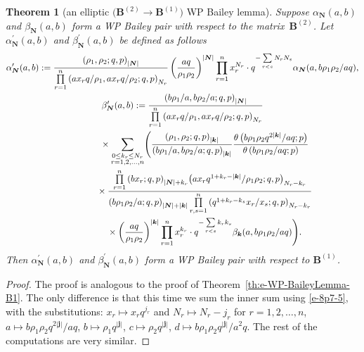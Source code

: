 \documentclass[pdftex]{sigma}
\numberwithin{equation}{section}
\newtheorem{Theorem}{Theorem}[section]
\newcommand{\sumN}{{\left| \boldsymbol{N} \right|}}
\newcommand\sumj{{\left| \boldsymbol {j} \right|}}
\newcommand\sumk{{\left| \boldsymbol{k} \right|}}
\newcommand{\B}{{ \mathbf B}}
\newcommand{\N}{{ \boldsymbol N}}
\renewcommand{\k}{{ \boldsymbol{k}}}
\newcommand{\multsum}[3]{{\sum\limits_{\substack{{0\le #1_#3 \le #2_#3} \\
{#3 =1,2,\dots, n}}}}}
\newcommand{\sqprod}[1]{\prod\limits_{r, s =1}^{#1}} %
\newcommand{\smallprod}[1]{\prod\limits_{r =1}^{#1}} %
\newcommand{\xover}[1]{#1_{r}/#1_{s}}
\newcommand{\ellipticqrfac}[2]{{\left({#1}; q, p\right)_{#2}}} %
\newcommand{\elliptictheta}[1]{\theta \left({#1} ; p\right) }
\begin{document}
\begin{Theorem}[an elliptic $\big(\B^{(2)} \to\B^{(1)}\big)$ WP Bailey lemma] \label{th:e-WP-BaileyLemma-B2-B1}
Suppose $\alpha_\N(a,b)$ and $\beta_\N(a,b)$ form a WP Bailey pair with respect to the matrix~$\B^{(2)}$. Let ${\alpha}^{\prime}_\N(a,b)$ and ${\beta}^{\prime}_\N(a,b)$ be defined as follows
\begin{gather*}
{\alpha}^{\prime}_\N(a,b) := \frac{\ellipticqrfac{\rho_1, \rho_2}{\sumN}}
 {\smallprod n \ellipticqrfac{ax_rq/\rho_1, ax_rq/\rho_2}{N_r}}
 \left(\frac{aq}{\rho_1\rho_2}\right)^{\sumN} %
 \smallprod n x_r^{N_r}\cdot
q^{-\sum\limits_{r<s} N_r N_s} \alpha_\N(a, b\rho_1\rho_2/aq),\\
{\beta}^{\prime}_\N (a,b) := \frac{\ellipticqrfac{b\rho_1/a, b\rho_2/a }{\sumN}}
{\smallprod n \ellipticqrfac{ax_rq/\rho_1, ax_rq/\rho_2}{N_r}}\\
\hphantom{{\beta}^{\prime}_\N (a,b) :=}{}
 \times \multsum{k}{N}{r} \Bigg( \frac{ \ellipticqrfac{\rho_1, \rho_2}{\sumk}}
{\ellipticqrfac{b\rho_1/a, b\rho_2/a}{\sumk}}
 \frac{\elliptictheta{ b\rho_1\rho_2q^{2\sumk}/{aq}}}{\elliptictheta{ b\rho_1\rho_2/{aq}}}\\
\hphantom{{\beta}^{\prime}_\N (a,b) :=}{}\times
\frac{\smallprod n \ellipticqrfac{bx_r}{\sumN+k_r}
 \ellipticqrfac{ax_rq^{1+k_r-\sumk}/\rho_1\rho_2 }{N_r-k_r}}{
\ellipticqrfac{b\rho_1\rho_2/a}{\sumN+\sumk}
\sqprod n \ellipticqrfac{q^{1+k_r-k_s}\xover x }{N_r-k_r}} \notag\\
\hphantom{{\beta}^{\prime}_\N (a,b) :=}{} \times
\left(\frac{aq}{\rho_1\rho_2}\right)^{\sumk} \smallprod n x_r^{k_r}\cdot q^{-\sum\limits_{r<s} k_rk_s} \beta_\k(a,b\rho_1\rho_2/aq) \Bigg).
\end{gather*}
Then ${\alpha}^{\prime}_\N(a,b)$ and ${\beta}^{\prime}_\N(a,b)$ form a WP Bailey pair with respect to $\B^{(1)}$.
\end{Theorem}

\begin{proof} The proof is analogous to the proof of Theorem~\ref{th:e-WP-BaileyLemma-B1}. The only difference is that this time we sum
the inner sum using \eqref{e-8p7-5}, with the substitutions: $x_r\mapsto x_rq^{j_r}$ and $N_r\mapsto N_r-j_r$ for $r=1, 2, \dots, n$,
$a\mapsto b\rho_1\rho_2q^{2\sumj}/aq$, $b\mapsto \rho_1q^{\sumj}$, $c\mapsto \rho_2q^{\sumj}$, $d\mapsto b\rho_1\rho_2q^{\sumj}/a^2q $. The rest of the computations are very similar.
\end{proof}
\end{document}
